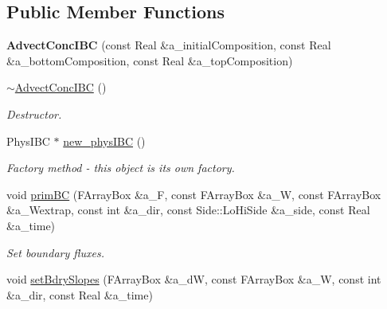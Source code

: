 \subsection*{Public Member Functions}
\begin{DoxyCompactItemize}
\item 
\hypertarget{class_advect_conc_i_b_c_a6aa39f2503e026b8293c7ec6afff2280}{{\bfseries Advect\-Conc\-I\-B\-C} (const Real \&a\-\_\-initial\-Composition, const Real \&a\-\_\-bottom\-Composition, const Real \&a\-\_\-top\-Composition)}\label{class_advect_conc_i_b_c_a6aa39f2503e026b8293c7ec6afff2280}

\item 
\hypertarget{class_advect_conc_i_b_c_a4616e987e32880a10ae6a19c8c9c0ed1}{\hyperlink{class_advect_conc_i_b_c_a4616e987e32880a10ae6a19c8c9c0ed1}{$\sim$\-Advect\-Conc\-I\-B\-C} ()}\label{class_advect_conc_i_b_c_a4616e987e32880a10ae6a19c8c9c0ed1}

\begin{DoxyCompactList}\small\item\em Destructor. \end{DoxyCompactList}\item 
\hypertarget{class_advect_conc_i_b_c_a30febc7d798f92945cc74ddda46ca0f6}{Phys\-I\-B\-C $\ast$ \hyperlink{class_advect_conc_i_b_c_a30febc7d798f92945cc74ddda46ca0f6}{new\-\_\-phys\-I\-B\-C} ()}\label{class_advect_conc_i_b_c_a30febc7d798f92945cc74ddda46ca0f6}

\begin{DoxyCompactList}\small\item\em Factory method -\/ this object is its own factory. \end{DoxyCompactList}\item 
\hypertarget{class_advect_conc_i_b_c_a5788340782965efe17c308be3b63e759}{void \hyperlink{class_advect_conc_i_b_c_a5788340782965efe17c308be3b63e759}{prim\-B\-C} (F\-Array\-Box \&a\-\_\-\-F, const F\-Array\-Box \&a\-\_\-\-W, const F\-Array\-Box \&a\-\_\-\-Wextrap, const int \&a\-\_\-dir, const Side\-::\-Lo\-Hi\-Side \&a\-\_\-side, const Real \&a\-\_\-time)}\label{class_advect_conc_i_b_c_a5788340782965efe17c308be3b63e759}

\begin{DoxyCompactList}\small\item\em Set boundary fluxes. \end{DoxyCompactList}\item 
\hypertarget{class_advect_conc_i_b_c_ac284d56a8bd0711d5713ab5974aab5a3}{void \hyperlink{class_advect_conc_i_b_c_ac284d56a8bd0711d5713ab5974aab5a3}{set\-Bdry\-Slopes} (F\-Array\-Box \&a\-\_\-d\-W, const F\-Array\-Box \&a\-\_\-\-W, const int \&a\-\_\-dir, const Real \&a\-\_\-time)}\label{class_advect_conc_i_b_c_ac284d56a8bd0711d5713ab5974aab5a3}


\end{DoxyCompactItemize}
